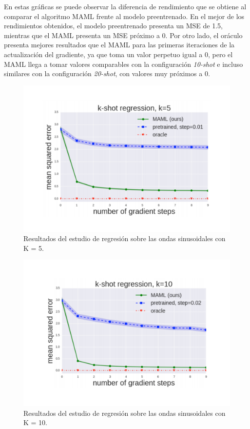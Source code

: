 En estas gráficas se puede observar la diferencia de rendimiento que se obtiene al comparar el algoritmo MAML frente al modelo preentrenado. En el mejor de los rendimientos obtenidos, el modelo preentrenado presenta un MSE de 1.5, mientras que el MAML presenta un MSE próximo a 0. Por otro lado, el oráculo presenta mejores resultados que el MAML para las primeras iteraciones de la actualización del gradiente, ya que toma un valor perpetuo igual a 0, pero el MAML llega a tomar valores comparables con la configuración \emph{10-shot} e incluso similares con la configuración \emph{20-shot}, con valores muy próximos a 0.

\begin{figure}[H]
\begin{center}
 \includegraphics[width=0.8\linewidth]{Figuras/MAML/sinusoid_1.pdf}
\end{center}
\caption{Resultados del estudio de regresión sobre las ondas sinusoidales con K = 5.}
 \label{fig:sinusoid_results_1}
\end{figure}

\begin{figure}[H]
\begin{center}
 \includegraphics[width=0.8\linewidth]{Figuras/MAML/sinusoid_2.pdf}
\end{center}
\caption{Resultados del estudio de regresión sobre las ondas sinusoidales con K = 10.}
 \label{fig:sinusoid_results_2}
\end{figure}

